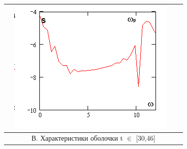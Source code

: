 \documentclass[12pt,letterpaper]{extreport}
\begin{document}
\begin{table}[H]
{\begin{tabular}{|c|c|c|c|}
	&
	\includegraphics[scale=1]{a4} 
\\
\hline
\multicolumn{4}{|c|}{В. Характеристики оболочки t $
\in$ [30,46]}\\


\end{tabular}}
\end{table}
\end{document}
